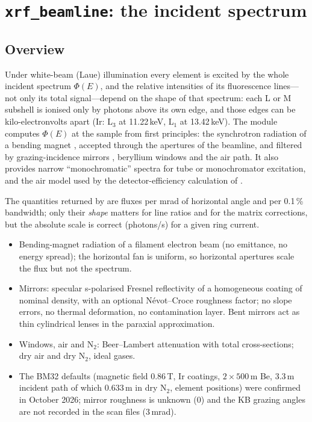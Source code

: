 \section{\texttt{xrf\_beamline}: the incident spectrum}\label{sec:beamline}

\subsection{Overview}

Under white-beam (Laue) illumination every element is excited by the whole incident
spectrum $\Phi(E)$, and the relative intensities of its fluorescence lines---not only its
total signal---depend on the shape of that spectrum: each L or M subshell is ionised only by
photons above its own edge, and those edges can be kilo-electronvolts apart (Ir: L$_3$ at
11.22\,keV, L$_1$ at 13.42\,keV). The module computes $\Phi(E)$ at the sample from first
principles: the synchrotron radiation of a bending magnet \citep{Schwinger1949,Kim1989},
accepted through the apertures of the beamline, and filtered by grazing-incidence mirrors
\citep{Parratt1954,Nevot1980}, beryllium windows and the air path. It also provides narrow
``monochromatic'' spectra for tube or monochromator excitation, and the air model used by
the detector-efficiency calculation of .

The quantities returned by  are fluxes per mrad of horizontal angle
and per 0.1\,\% bandwidth; only their \emph{shape} matters for line ratios and for the
matrix corrections, but the absolute scale is correct (photons/s) for a given ring current.

\begin{hyp}
\begin{itemize}[nosep,leftmargin=1em]
\item Bending-magnet radiation of a filament electron beam (no emittance, no energy spread);
  the horizontal fan is uniform, so horizontal apertures scale the flux but not the spectrum.
\item Mirrors: specular s-polarised Fresnel reflectivity of a homogeneous coating of nominal
  density, with an optional N\'evot--Croce roughness factor; no slope errors, no thermal
  deformation, no contamination layer. Bent mirrors act as thin cylindrical lenses in the
  paraxial approximation.
\item Windows, air and N$_2$: Beer--Lambert attenuation with total cross-sections; dry air
  and dry N$_2$, ideal gases.
\item The BM32 defaults (magnetic field 0.86\,T, Ir coatings, $2\times500$\,\textmu m Be,
  3.3\,m incident path of which 0.633\,m in dry N$_2$, element positions) were confirmed in October 2026; mirror roughness is
  unknown (0) and the KB grazing angles are not recorded in the scan files (3\,mrad).
\end{itemize}
\end{hyp}

